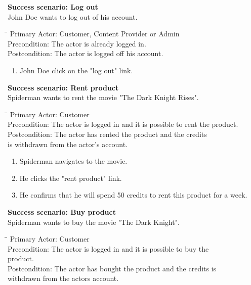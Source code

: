 \vspace{3mm}
\textbf{Success scenario: Log out} \\
John Doe wants to log out of his account. 
\begin{tabbing}
\hspace{5mm}\=\hspace{26mm}\=\kill
\>Primary Actor:\> Customer, Content Provider or Admin\\
\>Precondition:\> The actor is already logged in.\\
\>Postcondition:\> The actor is logged off his account.
\end{tabbing}
\begin{enumerate} \setlength{\itemsep}{-1mm}
	\item John Doe click on the "log out" link.
\end{enumerate}
\vspace{3mm}
\textbf{Success scenario: Rent product} \\
Spiderman wants to rent the movie "The Dark Knight Rises". 
\begin{tabbing}
\hspace{5mm}\=\hspace{26mm}\=\kill
\>Primary Actor:\> Customer\\
\>Precondition:\> The actor is logged in and it is possible to rent the product.\\
\>Postcondition:\> The actor has rented the product and the credits\\ \hspace{85px} is withdrawn from the actor's account.
\end{tabbing}
\begin{enumerate} \setlength{\itemsep}{-1mm}
	\item Spiderman navigates to the movie.
	\item He clicks the "rent product" link.
	\item He confirms that he will spend 50 credits to rent this product for a week. 
\end{enumerate}
\vspace{3mm}
\textbf{Success scenario: Buy product} \\
Spiderman wants to buy the movie "The Dark Knight". 
\begin{tabbing}
\hspace{5mm}\=\hspace{26mm}\=\kill
\>Primary Actor:\> Customer\\
\>Precondition:\> The actor is logged in and it is possible to buy the\\ \hspace{85px} product.\\
\>Postcondition:\> The actor has bought the product and the credits is\\ \hspace{85px} withdrawn from the actors account.
\end{tabbing}
